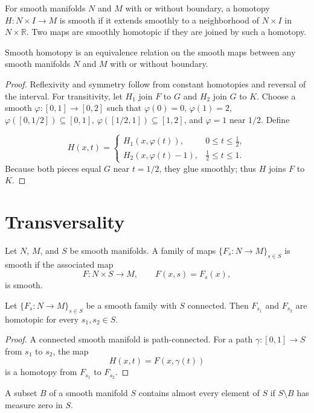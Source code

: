 \begin{definition}
\label{def:6-43-extra-1}
\leanok
For smooth manifolds $N$ and $M$ with or without boundary, a homotopy $H:N\times I\to M$ is smooth if it extends smoothly to a neighborhood of $N\times I$ in $N\times\mathbb{R}$. Two maps are smoothly homotopic if they are joined by such a homotopy.
\end{definition}

\begin{lemma}
\label{lem:6-28}
\leanok
{}
Smooth homotopy is an equivalence relation on the smooth maps between any smooth manifolds $N$ and $M$ with or without boundary.
\end{lemma}

\begin{proof}
\leanok
\sketch Reflexivity and symmetry follow from constant homotopies and reversal of the interval. For transitivity, let $H_1$ join $F$ to $G$ and $H_2$ join $G$ to $K$. Choose a smooth $\varphi:[0,1]\to[0,2]$ such that $\varphi(0)=0$, $\varphi(1)=2$, $\varphi([0,1/2])\subseteq[0,1]$, $\varphi([1/2,1])\subseteq[1,2]$, and $\varphi=1$ near $1/2$. Define

\[
H(x,t)=\begin{cases}
H_1(x,\varphi(t)),&0\leq t\leq \tfrac12,\\
H_2(x,\varphi(t)-1),&\tfrac12\leq t\leq1.
\end{cases}
\]
Because both pieces equal $G$ near $t=1/2$, they glue smoothly; thus $H$ joins $F$ to $K$.
\end{proof}


\section{Transversality}

\begin{definition}
\label{def:6-44-extra-2}
\leanok
Let $N$, $M$, and $S$ be smooth manifolds. A family of maps $\{F_s:N\to M\}_{s\in S}$ is smooth if the associated map
\[
F:N\times S\to M,
\qquad F(x,s)=F_s(x),
\]
is smooth.
\end{definition}

\begin{proposition}
\label{prop:6-34}
\leanok
{}
Let $\{F_s:N\to M\}_{s\in S}$ be a smooth family with $S$ connected. Then $F_{s_1}$ and $F_{s_2}$ are homotopic for every $s_1,s_2\in S$.
\end{proposition}

\begin{proof}
\leanok
\sketch A connected smooth manifold is path-connected. For a path $\gamma:[0,1]\to S$ from $s_1$ to $s_2$, the map
\[
H(x,t)=F(x,\gamma(t))
\]
is a homotopy from $F_{s_1}$ to $F_{s_2}$.
\end{proof}

\begin{definition}
\label{def:6-44-extra-3}
\leanok
A subset $B$ of a smooth manifold $S$ contains almost every element of $S$ if $S\setminus B$ has measure zero in $S$.
\end{definition}
